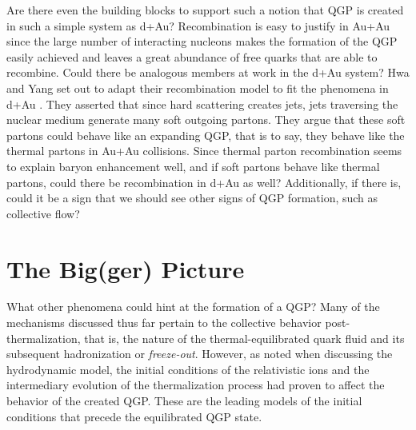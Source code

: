 Are there even the building blocks to support such a notion that QGP is created in such a simple system as d+Au? Recombination is easy to justify in Au+Au since the large number of interacting nucleons makes the formation of the QGP easily achieved and leaves a great abundance of free quarks that are able to recombine. Could there be analogous members at work in the d+Au system? 
Hwa and Yang set out to adapt their recombination model to fit the phenomena in d+Au \citep{PhysRevLett.93.082302}. They asserted that since hard scattering creates jets, jets traversing the nuclear medium generate many soft outgoing partons. They argue that these soft partons could behave like an expanding QGP, that is to say, they behave like the thermal partons in Au+Au collisions. Since thermal parton recombination seems to explain baryon enhancement well, and if soft partons behave like thermal partons, could there be recombination in d+Au as well? Additionally, if there is, could it be a sign that we should see other signs of QGP formation, such as collective flow? 

\section{The Big(ger) Picture}
What other phenomena could hint at the formation of a QGP? Many of the mechanisms discussed thus far pertain to the collective behavior post-thermalization, that is, the nature of the thermal-equilibrated quark fluid and its subsequent hadronization or \textit{freeze-out}. However, as noted when discussing the hydrodynamic model, the initial conditions of the relativistic ions and the intermediary evolution of the thermalization process had proven to affect the behavior of the created QGP. These are the leading models of the initial conditions that precede the equilibrated QGP state.

